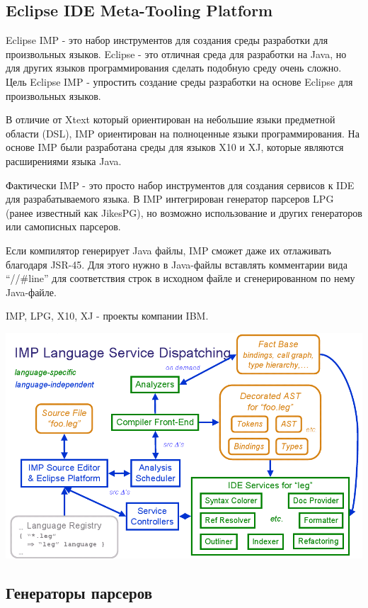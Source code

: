 \documentclass[a4paper,12pt]{article}
\begin{document}
\subsection{Eclipse IDE Meta-Tooling Platform}
Eclipse IMP - это набор инструментов для создания среды разработки для
произвольных языков.
Eclipse - это отличная среда для разработки на Java, но для
других языков программирования сделать подобную среду очень сложно. Цель
Eclipse IMP - упростить создание среды разработки на основе Eclipse для
произвольных языков.

В отличие от Xtext который ориентирован на небольшие языки предметной области
(DSL), IMP ориентирован на полноценные языки программирования. На основе IMP
были разработана среды для языков X10 и XJ, которые являются расширениями
языка Java.

Фактически IMP - это просто набор инструментов для создания сервисов к IDE для
разрабатываемого языка. В IMP интегрирован генератор парсеров LPG (ранее
известный как JikesPG), но возможно использование и других генераторов или
самописных парсеров.

Если компилятор генерирует Java файлы, IMP сможет даже их отлаживать благодаря
JSR-45. Для этого нужно в Java-файлы вставлять комментарии вида ``//\#line'' для
соответствия строк в исходном файле и сгенерированном по нему Java-файле.

IMP, LPG, X10, XJ - проекты компании IBM.

\includegraphics[scale=0.4]{img/imp.png}

\subsection{Генераторы парсеров}
\end{document}
